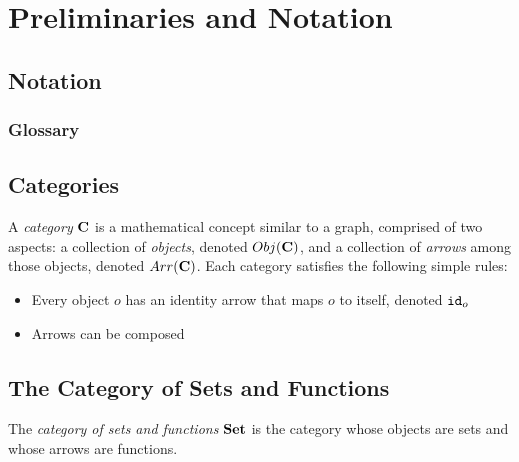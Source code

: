 

\chapter{Preliminaries and Notation} %
\label{ch:Preliminaries} %

\section{Notation}
\subsection{Glossary}

\section{Categories}
\begin{definition}
    A \emph{category} $\AsCategory{C}$ is a mathematical concept similar to a graph, comprised of two aspects: a collection of \emph{objects}, denoted $Obj(\AsCategory{C})$, and a collection of \emph{arrows} among those objects, denoted $Arr(\AsCategory{C})$. Each category satisfies the following simple rules:
    \begin{itemize}
        \item Every object $o$ has an identity arrow that maps $o$ to itself, denoted ${\texttt{id}}_o$
        \item Arrows can be composed
    \end{itemize}
\end{definition}

\section{The Category of Sets and Functions}
\begin{definition}
    The \emph{category of sets and functions} $\AsCategory{Set}$ is the category whose objects are sets and whose arrows are functions. 
\end{definition}

